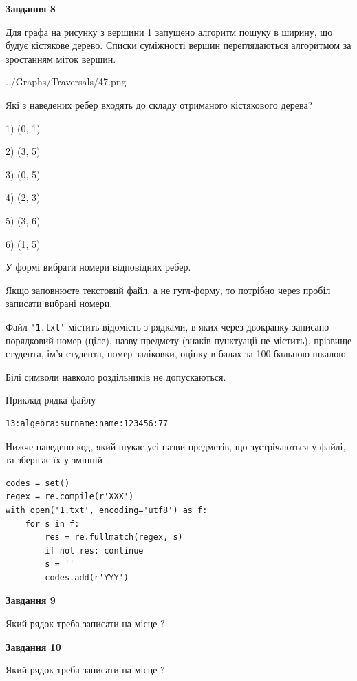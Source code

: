 \documentclass[12pt, ukrainian]{article}
\def\code#1{\Verb!#1!}
\begin{document}
{\begin {large}
{\begin {center}\textbf{Завдання 8}\end {center}}\par
Для графа на рисунку з вершини 1 запущено алгоритм пошуку в ширину, що будує кістякове дерево. Списки суміжності вершин переглядаються алгоритмом за зростанням міток вершин.\par
\begin{center}
	{../Graphs/Traversals/47.png}
\end{center}
\par Які з наведених ребер входять до складу отриманого кістякового дерева?\par
1) (0, 1)\par
2) (3, 5)\par
3) (0, 5)\par
4) (2, 3)\par
5) (3, 6)\par
6) (1, 5)\par
{\vskip 15pt} У формі вибрати номери відповідних ребер.


Якщо заповнюєте текстовий файл, а не гугл-форму, то потрібно через пробіл записа\-ти вибрані номери.\par
\newpage


Файл \code{'1.txt'} містить відомість з рядками, в яких через двокрапку записано поряд\-ковий номер (ціле), назву предмету (знаків пунктуації не містить), прізвище студента, ім'я студента, номер заліковки, оцінку в балах за 100 бальною шкалою.

Білі символи навколо роздільників не допускаються.

Приклад рядка файлу



\begin{verbatim}
13:algebra:surname:name:123456:77
\end{verbatim}


Нижче наведено код, який шукає усі назви предметів, що зустрічаються у файлі, та зберігає їх у змінній .



\begin{verbatim}
codes = set()
regex = re.compile(r'XXX')
with open('1.txt', encoding='utf8') as f:
    for s in f:
        res = re.fullmatch(regex, s)
        if not res: continue
        s = ''
        codes.add(r'YYY')
\end{verbatim}


{\begin {center}\textbf{Завдання 9}\end {center}}\par
Який рядок треба записати на місце  ?\par
\vspace{5mm}


{\begin {center}\textbf{Завдання 10}\end {center}}\par
Який рядок треба записати на місце  ?\par


\newpage


\end {large}}
\end{document}
